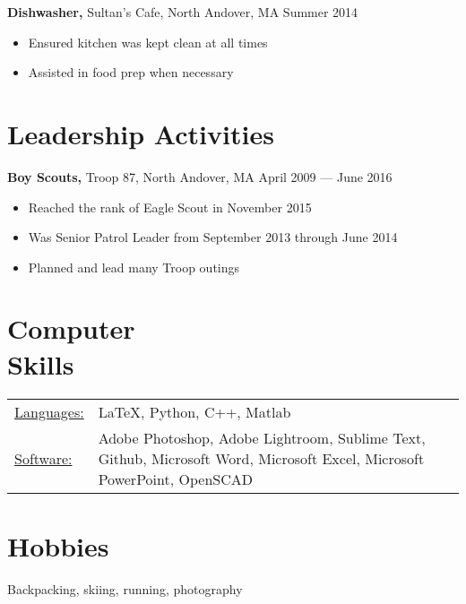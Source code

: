 \documentclass[margin]{res}
\begin{document}
\begin{resume}
	{\bf Dishwasher,} Sultan's Cafe, North Andover, MA \hfill Summer 2014
	\begin{itemize} \itemsep -2pt
		\item Ensured kitchen was kept clean at all times
		\item Assisted in food prep when necessary
	\end{itemize}
	
	\section{Leadership Activities} 
	{\bf Boy Scouts,} Troop 87, North Andover, MA \hfill April 2009 --- June 2016
	\begin{itemize} \itemsep -2pt
		\item Reached the rank of Eagle Scout in November 2015
		\item Was Senior Patrol Leader from September 2013 through June 2014
		\item Planned and lead many Troop outings
	\end{itemize}
	
	\section{Computer \\ Skills}
	\begin{tabular}{l p{3in}}
		\underline{Languages:} & \LaTeX, Python, C++, Matlab \\
		
		\underline{Software:}  & Adobe Photoshop, Adobe Lightroom, Sublime Text, Github, Microsoft Word, Microsoft Excel, Microsoft PowerPoint, OpenSCAD
	\end{tabular}

	\section{Hobbies}
	Backpacking, skiing, running, photography
	
\end{resume} 
\end{document}

